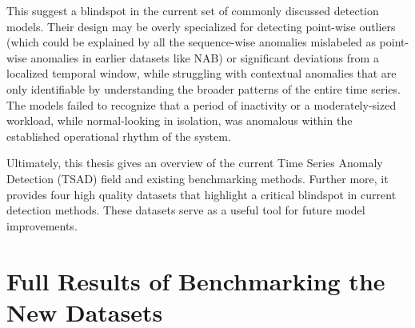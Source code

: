 \documentclass[12pt,oneside]{article}
\begin{document}
This suggest a blindspot in the current set of commonly discussed detection models. Their design may be overly specialized for detecting point-wise outliers (which could be explained by all the sequence-wise anomalies mislabeled as point-wise anomalies in earlier datasets like NAB) or significant deviations from a localized temporal window, while struggling with contextual anomalies that are only identifiable by understanding the broader patterns of the entire time series. The models failed to recognize that a period of inactivity or a moderately-sized workload, while normal-looking in isolation, was anomalous within the established operational rhythm of the system. \par

Ultimately, this thesis gives an overview of the current Time Series Anomaly Detection (TSAD) field and existing benchmarking methods. Further more, it provides four high quality datasets that highlight a critical blindspot in current detection methods. These datasets serve as a useful tool for future model improvements.












\clearpage
\lhead{}
\printbibliography
{}


\clearpage
\appendix
\section{Full Results of Benchmarking the New Datasets}
\end{document}
